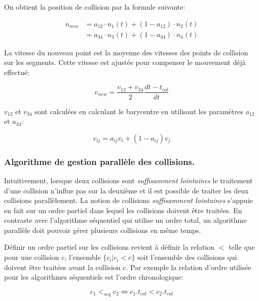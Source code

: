 \documentclass[11pt,class=article,float=false,crop=false]{standalone}
\begin{document}
On obtient la position de collision par la formule suivante:

\begin{equation}
\begin{split}
n_{new} &= a_{12} \cdot n_1(t) + (1-a_{12}) \cdot n_2(t) \\
&= a_{34} \cdot n_3(t) + (1-a_{34}) \cdot n_4(t)
\end{split}
\end{equation}

La vitesse du nouveau point est la moyenne des vitesses des points de collision sur les segments. Cette vitesse est ajustée pour compenser le mouvement déjà effectué:

\begin{equation}
v_{new} = \frac{v_{12}+v_{34}}2 \frac{dt-t_{col}}{dt}
\end{equation}

$v_{12}$ et $v_{34}$ sont calculées en calculant le barycentre en utilisant les paramètres $a_{12}$ et $a_{34}$:

\begin{equation}
v_{ij} = a_{ij} v_i + (1-a_{ij}) v_j
\end{equation}


\subsubsection{Algorithme de gestion parallèle des collisions.}

Intuitivement, lorsque deux collisions sont \textit{suffisamment lointaines} le traitement d'une collision n'influe pas sur la deuxième et il est possible de traiter les deux collisions parallèlement. La notion de collisions \textit{suffisamment lointaines} s'appuie en fait sur un ordre partiel dans lequel les collisions doivent être traitées. En contraste avec l'algorithme séquentiel qui utilise un ordre total, un algorithme parallèle doit pouvoir gérer plusieurs collisions en même temps. 

Définir un ordre partiel sur les collisions revient à définir la relation $<$ telle que pour une collision $c$, l'ensemble $\{c_i | c_i < c \}$ soit l'ensemble des collisions qui doivent être traitées avant la collision $c$. Par exemple la relation d'ordre utilisée pour les algorithmes séquentiels est l'ordre chronologique:

\begin{equation}
	 c_1 <_{seq} c_2 \Leftrightarrow c_1.t_{col} < c_2.t_{col}
\end{equation}
\end{document}
